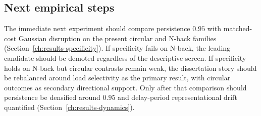 \subsection{Next empirical steps}

The immediate next experiment should compare persistence $0.95$ with
matched-cost Gaussian disruption on the present circular and N-back families
(Section~\ref{ch:results-specificity}). If specificity fails on N-back, the
leading candidate should be demoted regardless of the descriptive screen. If
specificity holds on N-back but circular contrasts remain weak, the
dissertation story should be rebalanced around load selectivity as the primary
result, with circular outcomes as secondary directional support. Only after
that comparison should persistence be densified around $0.95$ and delay-period
representational drift quantified (Section~\ref{ch:results-dynamics}).
